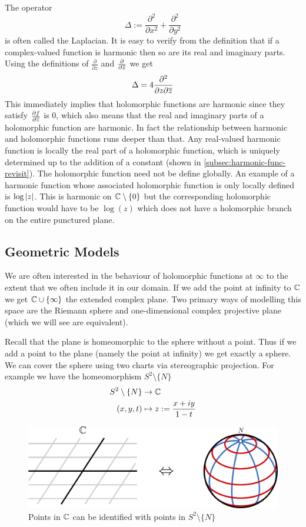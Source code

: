 The operator
$$\Delta := \frac{\partial^2}{\partial x^2} + \frac{\partial^2}{\partial y^2}$$
is often called the Laplacian. It is easy to verify from the definition that if a complex-valued function is harmonic then so are its real and imaginary parts. Using the definitions of $\frac{\partial}{\partial z}$ and $\frac{\partial}{\partial \overline{z}}$ we get
$$\Delta = 4\frac{\partial^2}{\partial z \partial \overline{z}}$$
This immediately implies that holomorphic functions are harmonic since they satisfy $\frac{\partial f}{\partial \overline{z}}$ is 0, which also means that the real and imaginary parts of a holomorphic function are harmonic. In fact the relationship between harmonic and holomorphic functions runs deeper than that. Any real-valued harmonic function is locally the real part of a holomorphic function, which is uniquely determined up to the addition of a constant (shown in \autoref{subsec:harmonic-func-revisit}). The holomorphic function need not be define globally. An example of a harmonic function whose associated holomorphic function is only locally defined is $\log\left|z\right|$. This is harmonic on $\mathbb{C} \setminus \{0\}$ but the corresponding holomorphic function would have to be $\log(z)$ which does not have a holomorphic branch on the entire punctured plane.

\subsection{Geometric Models}
We are often interested in the behaviour of holomorphic functions at $\infty$ to the extent that we often include it in our domain. If we add the point at infinity to $\mathbb{C}$ we get $\mathbb{C} \cup \{\infty\}$ the extended complex plane. Two primary ways of modelling this space are the Riemann sphere and one-dimensional complex projective plane (which we will see are equivalent).

Recall that the plane is homeomorphic to the sphere without a point. Thus if we add a point to the plane (namely the point at infinity) we get exactly a sphere. We can cover the sphere using two charts via stereographic projection. For example we have the homeomorphism $S^2 \setminus \{N\}$
\begin{align*}
    S^2 \setminus \{N\} &\to \mathbb{C}\\
    (x, y, t) &\mapsto z := \frac{x + iy}{1 - t}
\end{align*}
\begin{figure}[ht]
    \centering
    \includegraphics[scale=0.7]{Images/riemann_sphere_chart.png}
    \caption{Points in $\mathbb{C}$ can be identified with points in $S^2 \setminus \{N\}$}
    \label{fig:riemann-sphere-chart}
\end{figure}

